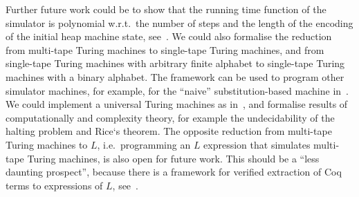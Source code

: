 Further future work could be to show that the running time function of the simulator is polynomial w.r.t.\ the number of steps and the length of the
encoding of the initial heap machine state, see~\cite{ForsterLOLA2017}.  We could also formalise the reduction from multi-tape Turing machines to
single-tape Turing machines, and from single-tape Turing machines with arbitrary finite alphabet to single-tape Turing machines with a binary
alphabet.  The framework can be used to program other simulator machines, for example, for the ``naive'' substitution-based machine
in~\cite{KunzeEtAl:2018:Formal}.  We could implement a universal Turing machines as in~\cite{asperti2015}, and formalise results of computationally
and complexity theory, for example the undecidability of the halting problem and Rice`s theorem.  The opposite reduction from multi-tape Turing
machines to $L$, i.e.\ programming an $L$ expression that simulates multi-tape Turing machines, is also open for future work.  This should be a ``less
daunting prospect'', because there is a framework for verified extraction of Coq terms to expressions of $L$, see~\cite{forster2016verified}.


